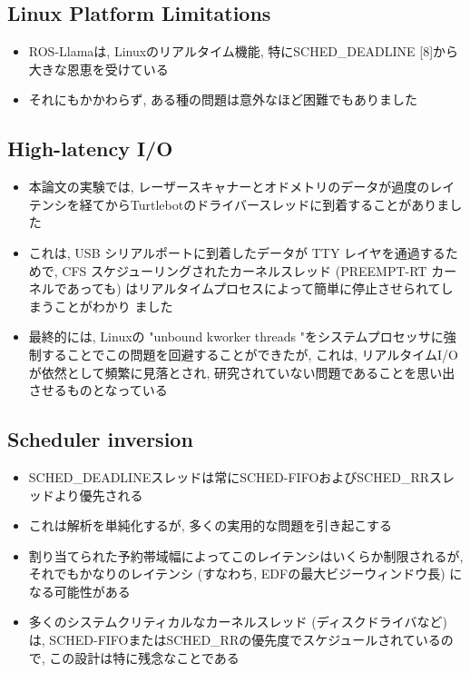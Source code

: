 \subsection{Linux Platform Limitations}
\label{ssec: linux platform limitations}

\begin{frame}{}
    \begin{itemize}
        \item ROS-Llamaは, Linuxのリアルタイム機能, 特にSCHED\_DEADLINE [8]から大きな恩恵を受けている
        \item それにもかかわらず, ある種の問題は意外なほど困難でもありました
    \end{itemize}
\end{frame}


\subsection{High-latency I/O}
\label{ssec: high-latency i/o}

\begin{frame}{}
    \begin{itemize}
        \item 本論文の実験では, レーザースキャナーとオドメトリのデータが過度のレイテンシを経てからTurtlebotのドライバースレッドに到着することがありました
        \item これは, USB シリアルポートに到着したデータが TTY レイヤを通過するためで, CFS スケジューリングされたカーネルスレッド (PREEMPT-RT カーネルであっても) はリアルタイムプロセスによって簡単に停止させられてしまうことがわかり ました
        \item 最終的には, Linuxの "unbound kworker threads "をシステムプロセッサに強制することでこの問題を回避することができたが, これは, リアルタイムI/Oが依然として頻繁に見落とされ, 研究されていない問題であることを思い出させるものとなっている
    \end{itemize}
\end{frame}


\subsection{Scheduler inversion}
\label{ssec: scheduler inversion}

\begin{frame}{}
    \begin{itemize}
        \item SCHED\_DEADLINEスレッドは常にSCHED-FIFOおよびSCHED\_RRスレッドより優先される
        \item これは解析を単純化するが, 多くの実用的な問題を引き起こする
        \item 割り当てられた予約帯域幅によってこのレイテンシはいくらか制限されるが, それでもかなりのレイテンシ (すなわち, EDFの最大ビジーウィンドウ長) になる可能性がある
        \item 多くのシステムクリティカルなカーネルスレッド (ディスクドライバなど) は, SCHED-FIFOまたはSCHED\_RRの優先度でスケジュールされているので, この設計は特に残念なことである
    \end{itemize}
\end{frame}

